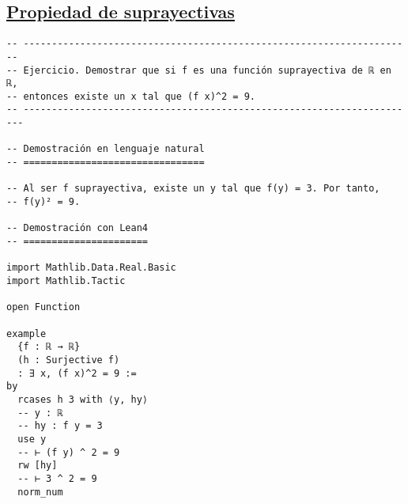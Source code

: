 \subsection{\href{./src/Logica/Propiedad\_de\_suprayectivas.lean}{Propiedad de suprayectivas}}
\label{sec:org0b76df5}
\begin{verbatim}
-- ---------------------------------------------------------------------
-- Ejercicio. Demostrar que si f es una función suprayectiva de ℝ en ℝ,
-- entonces existe un x tal que (f x)^2 = 9.
-- ----------------------------------------------------------------------

-- Demostración en lenguaje natural
-- ================================

-- Al ser f suprayectiva, existe un y tal que f(y) = 3. Por tanto,
-- f(y)² = 9.

-- Demostración con Lean4
-- ======================

import Mathlib.Data.Real.Basic
import Mathlib.Tactic

open Function

example
  {f : ℝ → ℝ}
  (h : Surjective f)
  : ∃ x, (f x)^2 = 9 :=
by
  rcases h 3 with ⟨y, hy⟩
  -- y : ℝ
  -- hy : f y = 3
  use y
  -- ⊢ (f y) ^ 2 = 9
  rw [hy]
  -- ⊢ 3 ^ 2 = 9
  norm_num
\end{verbatim}

